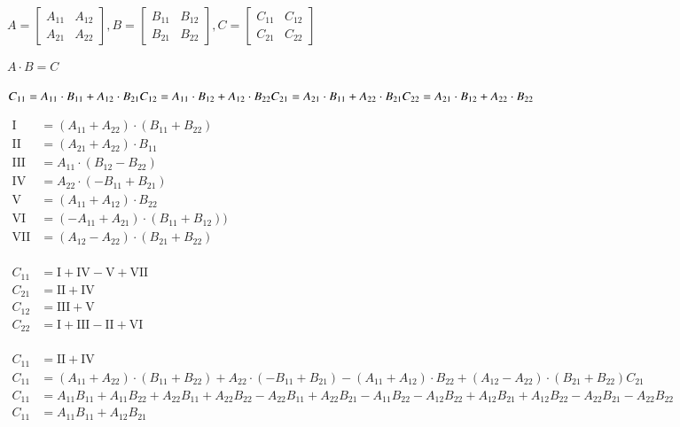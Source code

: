 \documentclass[border=10pt,varwidth]{standalone}
\begin{document}
$
A=
\begin{bmatrix}
A_{11} & A_{12}\\
A_{21} & A_{22}
\end{bmatrix},
B=
\begin{bmatrix}
B_{11} & B_{12}\\
B_{21} & B_{22}
\end{bmatrix},
C=
\begin{bmatrix}
C_{11} & C_{12}\\
C_{21} & C_{22}
\end{bmatrix}
$

\medskip
$
A \cdot B = C
$

\medskip
$
C_{11} = A_{11} \cdot B_{11} + A_{12} \cdot B_{21}\\
C_{12} = A_{11} \cdot B_{12} + A_{12} \cdot B_{22}\\
C_{21} = A_{21} \cdot B_{11} + A_{22} \cdot B_{21}\\
C_{22} = A_{21} \cdot B_{12} + A_{22} \cdot B_{22}
$

\medskip
\begin{math}
\begin{aligned}
\text{I}   &= (A_{11} + A_{22}) \cdot (B_{11} + B_{22}) \\
\text{II}  &= (A_{21} + A_{22}) \cdot B_{11} \\
\text{III} &= A_{11} \cdot (B_{12}-B_{22}) \\
\text{IV}  &= A_{22} \cdot (-B_{11}+B_{21}) \\
\text{V}   &= (A_{11} + A_{12}) \cdot B_{22} \\
\text{VI}  &= (-A_{11} + A_{21}) \cdot (B_{11} + B_{12})) \\
\text{VII} &= (A_{12} - A_{22}) \cdot (B_{21} + B_{22}) \\
\end{aligned}
\end{math}


\medskip
\begin{math}
\begin{aligned}
C_{11} &= \text{I} + \text{IV} - \text{V} + \text{VII} \\
C_{21} &= \text{II} + \text{IV} \\
C_{12} &= \text{III} + \text{V}\\
C_{22} &= \text{I} + \text{III} - \text{II} + \text{VI} \\
\end{aligned}
\end{math}


\medskip
\begin{math}
\begin{aligned}
C_{11} &= \text{II} + \text{IV} \\
C_{11} &= (A_{11} + A_{22}) \cdot (B_{11} + B_{22}) + A_{22} \cdot (-B_{11}+B_{21}) - (A_{11} + A_{12}) \cdot B_{22} + (A_{12} - A_{22}) \cdot (B_{21} + B_{22})C_{21} \\
C_{11} &= A_{11}B_{11} + A_{11}B_{22} + A_{22}B_{11} + A_{22}B_{22} -A_{22}B_{11}+A_{22}B_{21} - A_{11}B_{22} - A_{12}B_{22}+ A_{12}B_{21} + A_{12}B_{22} - A_{22}B_{21} - A_{22}B_{22} \\
C_{11} &= A_{11}B_{11} + A_{12}B_{21}
\end{aligned}
\end{math}
\end{document}
